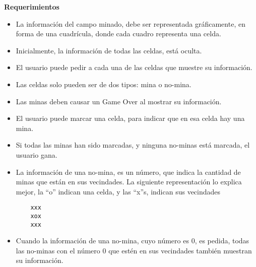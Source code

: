 \textbf{Requerimientos}
\begin{itemize}
\item La información del campo minado, debe ser representada gráficamente, en forma de una cuadrícula, donde cada cuadro representa una celda.
\item Inicialmente, la información de todas las celdas, está oculta.
\item El usuario puede pedir a cada una de las celdas que muestre su información.
\item Las celdas solo pueden ser de dos tipos: mina o no-mina.
\item Las minas deben causar un Game Over al mostrar su información.
\item El usuario puede marcar una celda, para indicar que en esa celda hay una mina.
\item Si todas las minas han sido marcadas, y ninguna no-minas está marcada, el usuario gana.
\item La información de una no-mina, es un número, que indica la cantidad de minas que están en sus vecindades. La siguiente representación lo explica mejor, la ``o'' indican una celda, y las ``x''s, indican sus vecindades
  \begin{lstlisting}
    xxx
    xox
    xxx
  \end{lstlisting}
\item Cuando la información de una no-mina, cuyo número es 0, es pedida, todas las no-minas con el número 0 que estén en sus vecindades también muestran su información.
\end{itemize}

